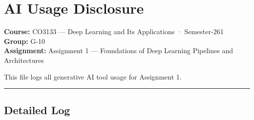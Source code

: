 \section*{AI Usage Disclosure}

\textbf{Course:} CO3133 — Deep Learning and Its Applications · Semester-261\\
\textbf{Group:} G-10\\
\textbf{Assignment:} Assignment 1 — Foundations of Deep Learning Pipelines and Architectures

This file logs all generative AI tool usage for Assignment 1.

\noindent\rule{\linewidth}{0.4pt}

\subsection*{Detailed Log}


